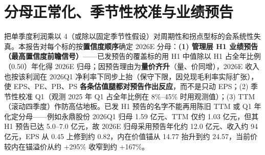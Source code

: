 \section{分母正常化、季节性校准与业绩预告}
把单季度利润乘以 4（或除以固定季节性假设）对周期性和拐点型标的会系统性失真。本报告对每个标的按\textbf{置信度顺序}确定 2026E 分母：\textbf{(1) 管理层 H1 业绩预告（最高置信度前瞻信号）}——已发预告的覆盖标的用 H1 中值除以 H1 占全年比例（0.50）年化得 2026E 归母；因预告理由为\textbf{量价齐升}（量、价同增），2026E 收入也按该利润在 2026Q1 净利率下同步上抬（保守下限，因兑现毛利率实际扩张），使 EPS、PE、PB、PS \textbf{各条估值腿都对预告作出反应}，而不是只动 EPS；(2) 季节性校准 Q1（观测 2025 年 Q1 占全年比例在 8\%--45\% 时用观测值）；(3) TTM（滚动四季度）作防高估地板。已发 H1 预告的名字不能再用陈旧 TTM 或 Q1 年化定分母——例如永鼎股份 2026Q1 归母 1.59 亿元、TTM 仅约 1.03 亿元，但其 H1 预告已达 5.0--7.0 亿元，故 2026E 归母采用预告年化约 12.0 亿元、收入约 94 亿元，EPS 从 0.45 上修到约 0.82，内在价值锚从 14.77 抬升到约 24.57，当前价较内在锚溢价从约 +295\% 收窄到约 +167\%。

